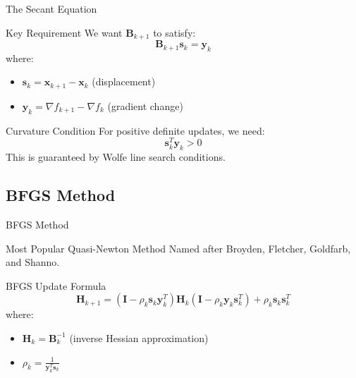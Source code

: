\documentclass[aspectratio=1610]{beamer}
\begin{document}
\begin{frame}{The Secant Equation}
  \begin{block}{Key Requirement}
    We want $\mathbf{B}_{k+1}$ to satisfy:
    $$\mathbf{B}_{k+1} \mathbf{s}_k = \mathbf{y}_k$$
    where:
    \begin{itemize}
      \item $\mathbf{s}_k = \mathbf{x}_{k+1} - \mathbf{x}_k$ (displacement)
      \item $\mathbf{y}_k = \nabla f_{k+1} - \nabla f_k$ (gradient change)
    \end{itemize}
  \end{block}
  
  \vspace{0.5cm}
  \begin{block}{Curvature Condition}
    For positive definite updates, we need:
    $$\mathbf{s}_k^T \mathbf{y}_k > 0$$
    This is guaranteed by Wolfe line search conditions.
  \end{block}
\end{frame}

\subsection{BFGS Method}

\begin{frame}{BFGS Method}
  \begin{block}{Most Popular Quasi-Newton Method}
    Named after Broyden, Fletcher, Goldfarb, and Shanno.
  \end{block}
  
  \vspace{0.5cm}
  \begin{block}{BFGS Update Formula}
    $$\mathbf{H}_{k+1} = \left(\mathbf{I} - \rho_k \mathbf{s}_k \mathbf{y}_k^T\right) \mathbf{H}_k \left(\mathbf{I} - \rho_k \mathbf{y}_k \mathbf{s}_k^T\right) + \rho_k \mathbf{s}_k \mathbf{s}_k^T$$
    where:
    \begin{itemize}
      \item $\mathbf{H}_k = \mathbf{B}_k^{-1}$ (inverse Hessian approximation)
      \item $\rho_k = \frac{1}{\mathbf{y}_k^T \mathbf{s}_k}$
    \end{itemize}
  \end{block}
\end{frame}
\end{document}
